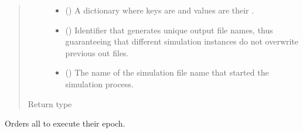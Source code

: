 \documentclass[letterpaper,10pt,english]{sphinxmanual}
\begin{document}
\begin{fulllineitems}
\begin{fulllineitems}
\begin{quote}
\begin{description}
\begin{itemize}
\item {} 
 ({\hyperref[\detokenize{app:app.type_hints.NodeDict}]{}}) \textendash{} A dictionary where keys are {\hyperref[\detokenize{app.domain:app.domain.network_nodes.Node.id}]{}} and values are their
{\hyperref[\detokenize{app.domain:app.domain.network_nodes.Node}]{}}.

\item {} 
 () \textendash{} Identifier that generates unique output file names,
thus guaranteeing that different simulation instances do not
overwrite previous out files.

\item {} 
 () \textendash{} The name of the simulation file name that started
the simulation process.

\end{itemize}

\item[{Return type}] \leavevmode
{}

\end{description}\end{quote}

\end{fulllineitems}


\begin{fulllineitems}
\label{\detokenize{app.domain:app.domain.cluster_groups.SGClusterPerfect.execute_epoch}}
Orders all  to execute their epoch.


\end{fulllineitems}
\end{fulllineitems}
\end{document}
